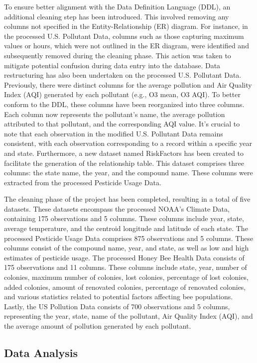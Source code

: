 \documentclass[
  letterpaper,
  DIV=11,
  numbers=noendperiod]{scrartcl}
\begin{document}
To ensure better alignment with the Data Definition Language (DDL), an
additional cleaning step has been introduced. This involved removing any
columns not specified in the Entity-Relationship (ER) diagram. For
instance, in the processed U.S. Pollutant Data, columns such as those
capturing maximum values or hours, which were not outlined in the ER
diagram, were identified and subsequently removed during the cleaning
phase. This action was taken to mitigate potential confusion during data
entry into the database. Data restructuring has also been undertaken on
the processed U.S. Pollutant Data. Previously, there were distinct
columns for the average pollution and Air Quality Index (AQI) generated
by each pollutant (e.g., O3 mean, O3 AQI). To better conform to the DDL,
these columns have been reorganized into three columns. Each column now
represents the pollutant's name, the average pollution attributed to
that pollutant, and the corresponding AQI value. It's crucial to note
that each observation in the modified U.S. Pollutant Data remains
consistent, with each observation corresponding to a record within a
specific year and state. Furthermore, a new dataset named RiskFactors
has been created to facilitate the generation of the relationship table.
This dataset comprises three columns: the state name, the year, and the
compound name. These columns were extracted from the processed Pesticide
Usage Data.

The cleaning phase of the project has been completed, resulting in a
total of five datasets. These datasets encompass the processed NOAA's
Climate Data, containing 175 observations and 5 columns. These columns
include year, state, average temperature, and the centroid longitude and
latitude of each state. The processed Pesticide Usage Data comprises 875
observations and 5 columns. These columns consist of the compound name,
year, and state, as well as low and high estimates of pesticide usage.
The processed Honey Bee Health Data consists of 175 observations and 11
columns. These columns include state, year, number of colonies, maximum
number of colonies, lost colonies, percentage of lost colonies, added
colonies, amount of renovated colonies, percentage of renovated
colonies, and various statistics related to potential factors affecting
bee populations. Lastly, the US Pollution Data consists of 700
observations and 5 columns, representing the year, state, name of the
pollutant, Air Quality Index (AQI), and the average amount of pollution
generated by each pollutant.

\subsection{Data Analysis}\label{data-analysis}
\end{document}
